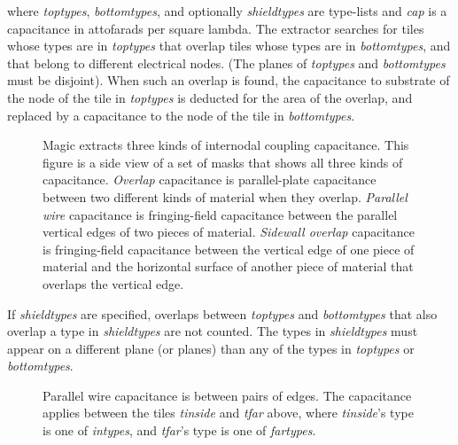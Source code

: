 \documentclass[letterpaper,twoside,12pt]{article}
\begin{document}
where {\itshape toptypes}, {\itshape bottomtypes}, and optionally
{\itshape shieldtypes} are type-lists and {\itshape cap}
is a capacitance in attofarads per square lambda.
The extractor searches for tiles whose types are in {\itshape toptypes}
that overlap tiles whose types are in {\itshape bottomtypes}, and
that belong to different electrical nodes.
(The planes of {\itshape toptypes} and {\itshape bottomtypes} must be disjoint).
When such an overlap is found, the capacitance to substrate
of the node of the tile in {\itshape toptypes} is deducted for the
area of the overlap,
and replaced by a capacitance to the node of the tile in {\itshape bottomtypes}.

\begin{figure}[ht]
   \begin{center}
      \caption{Magic extracts three kinds of internodal coupling
	capacitance.  This figure is a side view of a set of masks that shows
	all three kinds of capacitance.  {\itshape Overlap} capacitance is
	parallel-plate capacitance between two different kinds of material
	when they overlap.  {\itshape Parallel wire} capacitance is
	fringing-field capacitance between the parallel vertical edges
	of two pieces of material.  {\itshape Sidewall overlap} capacitance
	is fringing-field capacitance between the vertical edge of one piece
	of material and the horizontal surface of another piece of material
	that overlaps the vertical edge.}
      \label{capextract}
   \end{center}
\end{figure}

If {\itshape shieldtypes} are specified, overlaps between {\itshape toptypes}
and {\itshape bottomtypes} that also overlap a type in {\itshape shieldtypes}
are not counted.
The types in {\itshape shieldtypes} must appear on a different plane 
(or planes) than any of the types in {\itshape toptypes} or {\itshape bottomtypes}.

\begin{figure}[ht!]
   \begin{center}
      \caption{Parallel wire capacitance is between pairs of edges.
	The capacitance applies between the tiles {\itshape tinside}
	and {\itshape tfar} above, where {\itshape tinside}'s type is
	one of {\itshape intypes}, and {\itshape tfar}'s type is
	one of {\itshape fartypes}.}
      \label{wirecap}
   \end{center}
\end{figure}
\end{document}
